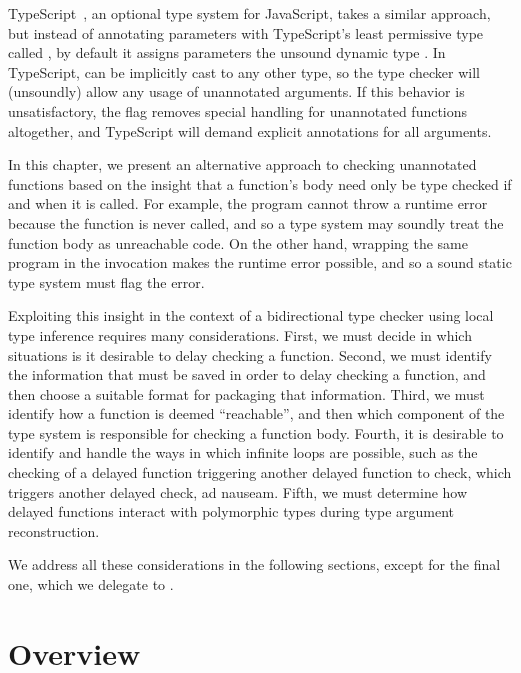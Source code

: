 TypeScript~\cite{typescript}, an optional type system for JavaScript,
takes a similar approach, but instead of annotating parameters with
TypeScript's least permissive type called ,
by default it assigns parameters the unsound dynamic type .
In TypeScript,  can be implicitly cast to any other type,
so the type checker will (unsoundly) allow any usage of unannotated arguments.
If this behavior is unsatisfactory,
the  flag removes special handling for unannotated
functions altogether, and TypeScript will demand explicit annotations for all arguments.

In this chapter, we present an alternative approach to checking unannotated functions
based on the insight that a function's body need only be type checked if and when it is called.
For example, the program  cannot throw a runtime error because
the function is never called, and so a type system may soundly treat the function body as unreachable code.
On the other hand, wrapping the same program in the invocation
makes the runtime error possible, and so a sound static type system must flag the error.

Exploiting this insight in the context of a bidirectional type checker using
local type inference requires many considerations.
First, we must decide in which situations is it desirable to delay checking a function.
Second, we must identify the information that must be saved in order to delay checking a function,
and then choose a suitable format for packaging that information.
Third, we must identify how a function is deemed ``reachable'',
and then which component of the type system is responsible for checking a function body.
Fourth, it is desirable to identify and handle the ways in which 
infinite loops are possible, such as the checking of a delayed function triggering
another delayed function to check, which triggers another delayed check, ad nauseam.
Fifth, we must determine how delayed functions interact with polymorphic types
during type argument reconstruction.

We address all these considerations in the following sections, except
for the final one, which we delegate to .

\section{Overview}
\label{symbolic:section:overview}

